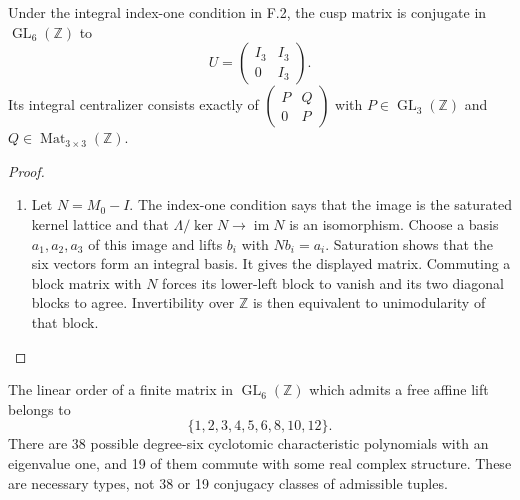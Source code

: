 \begin{proposition}\label{maps:src:F.2.1}


Under the integral index-one condition in F.2, the cusp matrix is
conjugate in $\operatorname{GL}_6(\mathbb Z)$ to
\[
 U=\begin{pmatrix}I_3&I_3\\0&I_3\end{pmatrix}.
\]
Its integral centralizer consists exactly of
$\left(\begin{smallmatrix}P&Q\\0&P\end{smallmatrix}\right)$
with $P\in\operatorname{GL}_3(\mathbb Z)$ and
$Q\in\operatorname{Mat}_{3\times3}(\mathbb Z)$.

\end{proposition}


\begin{proof}
\begin{enumerate}[label=\arabic*.]
\item Let $N=M_0-I$.  The index-one condition says that the image
is the saturated kernel lattice and that
$\Lambda/\ker N\to\operatorname{im}N$ is an isomorphism.
Choose a basis $a_1,a_2,a_3$ of this image and lifts $b_i$ with
$Nb_i=a_i$.  Saturation shows that the six vectors form an
integral basis.  It gives the displayed matrix.  Commuting a
block matrix with $N$ forces its lower-left block to vanish
and its two diagonal blocks to agree.  Invertibility over
$\mathbb Z$ is then equivalent to unimodularity of that block.

\end{enumerate}
\end{proof}




\begin{proposition}\label{maps:src:F.2.2}


The linear order of a finite matrix in $\operatorname{GL}_6(\mathbb Z)$
which admits a free affine lift belongs to
\[
 \{1,2,3,4,5,6,8,10,12\}.
 \tag{F.3}\label{maps:eq:F.3}
\]
There are 38 possible degree-six cyclotomic characteristic
polynomials with an eigenvalue one, and 19 of them commute
with some real complex structure.  These are necessary types,
not 38 or 19 conjugacy classes of admissible tuples.

\end{proposition}


